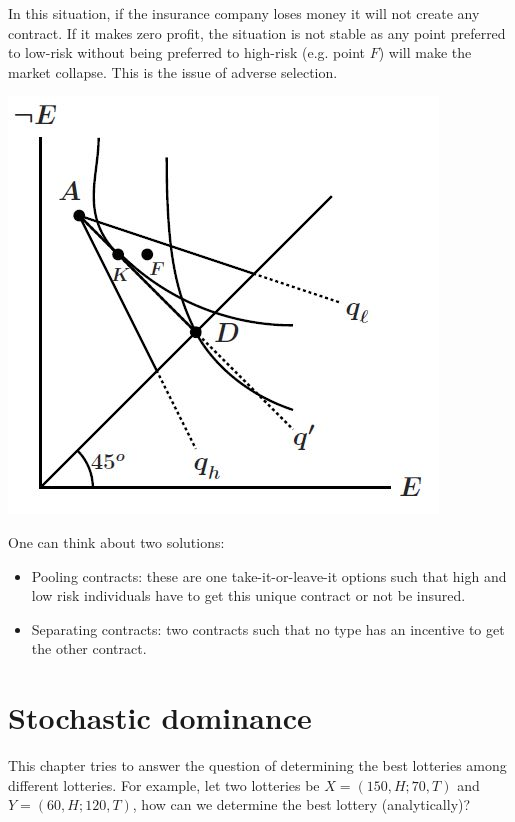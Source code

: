 \documentclass[12pt]{report}
\begin{document}
\begin{minipage}{0.69\textwidth}
In this situation, if the insurance company loses money it will not create any contract. If it makes zero profit, the situation is not stable as any point preferred to low-risk without being preferred to high-risk (e.g. point $F$) will make the market collapse. This is the issue of adverse selection.
\end{minipage}
\begin{minipage}{0.29\textwidth}
\centering
\includegraphics[scale=0.35]{images/advsel2}
\end{minipage} \hfill

One can think about two solutions:\begin{itemize}
\item Pooling contracts: these are one take-it-or-leave-it options such that high and low risk individuals have to get this unique contract or not be insured.
\item Separating contracts: two contracts such that no type has an incentive to get the other contract.
\end{itemize}

\chapter{Stochastic dominance}

This chapter tries to answer the question of determining the best lotteries among different lotteries. For example, let two lotteries be $X = (150, H; 70, T)$ and $Y=(60,H;120,T)$, how can we determine the best lottery (analytically)?
\end{document}
